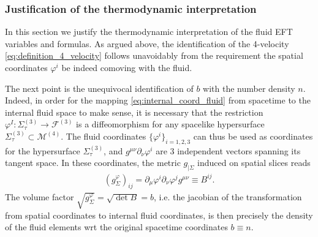 \subsubsection{Justification of the thermodynamic interpretation}
In this section we justify the thermodynamic interpretation of the fluid EFT variables and formulas.
As argued above, the identification of the 4-velocity \eqref{eq:definition_4_velocity} follows unavoidably from the requirement the spatial coordinates $\varphi^i$ be indeed comoving with the fluid.

The next point is the unequivocal identification of $b$ with the number density $n$.
Indeed, in order for the mapping \eqref{eq:internal_coord_fluid} from spacetime to the internal fluid space to make sense, it is necessary that the restriction $\varphi^{I}:\Sigma_\tau^{(3)}\to \mathcal{F}^{(3)}$ is a diffeomorphism for any spacelike hypersurface $\Sigma_\tau^{(3)}\subset \mathcal{M}^{(4)}$.
The fluid coordinates $\{\varphi^i\}_{i=1,2,3}$ can thus be used as coordinates for the hypersurface $\Sigma_\tau^{(3)}$, and $g^{\mu\nu}\partial_\nu\varphi^i$ are 3 independent vectors spanning its tangent space.
In these coordinates, the metric $g_{|\Sigma}$ induced on spatial slices reads
\begin{align}
    (g^\varphi_{\Sigma})_{ij} = \partial_\mu \varphi^i\partial_\nu \varphi^j g^{\mu\nu}\equiv B^{ij}.
\end{align}
The volume factor $\sqrt{g^\varphi_\Sigma}=\sqrt{\det B}=b$, i.e. the jacobian of the transformation from spatial coordinates to internal fluid coordinates, is then precisely the density of the fluid elements wrt the original spacetime coordinates $b\equiv n$.

